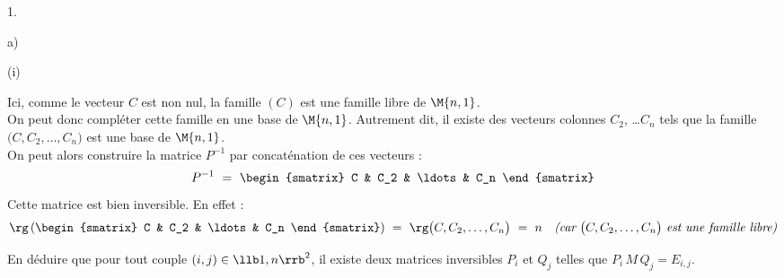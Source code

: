 \documentclass[11pt]{article}%
\begin{document}
\begin{noliste}{1.}
\begin{noliste}{a)}
\begin{nonoliste}{(i)}
\begin{remarkL}{1.05}
\[        \]
        Ici, comme le vecteur $C$ est non nul, la famille $(C)$ est
        une famille libre de $\M{n, 1}$. \\
        On peut donc compléter cette famille en une base de $\M{n,
          1}$. Autrement dit, il existe des vecteurs colonnes $C_2$,
        \ldots $C_n$ tels que la famille $\big( C, C_2, \ldots, C_n
        \big)$ est une base de $\M{n,1}$.\\
        On peut alors construire la matrice $P^{-1}$ par concaténation
        de ces vecteurs :
        \[
        P^{-1} \ = \
        \begin{smatrix}
          C & C_2 & \ldots & C_n
        \end{smatrix}
        \]
        Cette matrice est bien inversible. En effet :
        \[
        \rg\left(
          \begin{smatrix}
            C & C_2 & \ldots & C_n
          \end{smatrix}
        \right) \ = \ \rg \big( C, C_2, \ldots, C_n \big) \ = \ n
        \quad \text{\it (car $\big( C, C_2, \ldots, C_n \big)$ est
          une famille libre)}
        \]
      \end{remarkL}


      \newpage


    \item En déduire que pour tout couple $(i, j) \in \llb 1,
      n\rrb^2$, il existe deux matrices inversibles $P_i$ et $Q_j$
      telles que $P_i \, M \, Q_j = E_{i, j}$.


\end{nonoliste}
\end{noliste}
\end{noliste}
\end{document}
